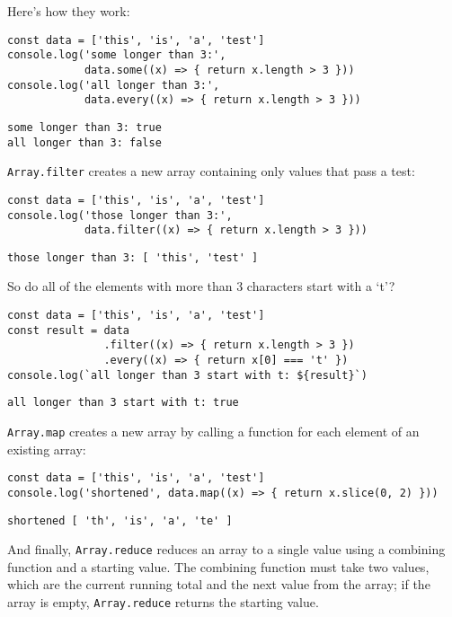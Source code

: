 Here's how they work:

\begin{verbatim}
const data = ['this', 'is', 'a', 'test']
console.log('some longer than 3:',
            data.some((x) => { return x.length > 3 }))
console.log('all longer than 3:',
            data.every((x) => { return x.length > 3 }))
\end{verbatim}

\begin{verbatim}
some longer than 3: true
all longer than 3: false
\end{verbatim}

\texttt{Array.filter} creates a new array containing only values that pass a test:

\begin{verbatim}
const data = ['this', 'is', 'a', 'test']
console.log('those longer than 3:',
            data.filter((x) => { return x.length > 3 }))
\end{verbatim}

\begin{verbatim}
those longer than 3: [ 'this', 'test' ]
\end{verbatim}

So do all of the elements with more than 3 characters start with a `t'?

\begin{verbatim}
const data = ['this', 'is', 'a', 'test']
const result = data
               .filter((x) => { return x.length > 3 })
               .every((x) => { return x[0] === 't' })
console.log(`all longer than 3 start with t: ${result}`)
\end{verbatim}

\begin{verbatim}
all longer than 3 start with t: true
\end{verbatim}

\texttt{Array.map} creates a new array by calling a function for each element of an existing array:

\begin{verbatim}
const data = ['this', 'is', 'a', 'test']
console.log('shortened', data.map((x) => { return x.slice(0, 2) }))
\end{verbatim}

\begin{verbatim}
shortened [ 'th', 'is', 'a', 'te' ]
\end{verbatim}

And finally,
\texttt{Array.reduce} reduces an array to a single value
using a combining function and a starting value.
The combining function must take two values,
which are the current running total and the next value from the array;
if the array is empty,
\texttt{Array.reduce} returns the starting value.

